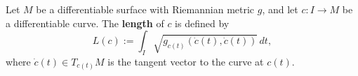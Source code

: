 Let $M$ be a differentiable surface with Riemannian metric $g$, and let $c: I \to M$ be a differentiable curve. The \textbf{length} of $c$ is defined by
$$L(c) := \int_I \sqrt{g_{c(t)}(\dot{c}(t), \dot{c}(t))} \, dt,$$
where $\dot{c}(t) \in T_{c(t)} M$ is the tangent vector to the curve at $c(t)$.
